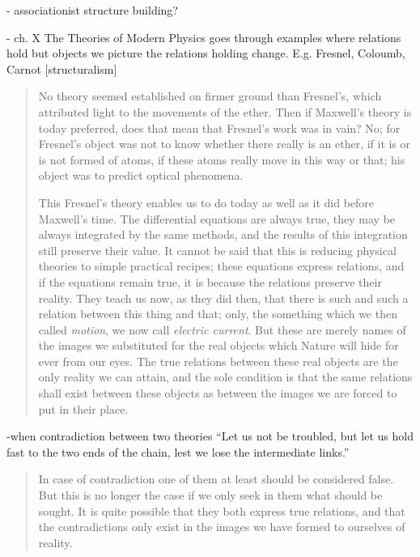  - associationist structure building?
 
 - ch. X The Theories of Modern Physics goes through examples where relations hold but objects we picture the relations holding change.  E.g. Fresnel, Coloumb, Carnot [structuralism]
 
 \begin{quote}
     No theory seemed established on firmer ground than Fresnel's, which attributed light to the movements of the ether.  Then if Maxwell's theory is today preferred, does that mean that Fresnel's work was in vain?  No; for Fresnel's object was not to know whether there really is an ether, if it is or is not formed of atoms, if these atoms really move in this way or that; his object was to predict optical phenomena.
     
     This Fresnel's theory enables us to do today as well as it did before Maxwell's time.  The differential equations are always true, they may be always integrated by the same methods, and the results of this integration still preserve their value.  It cannot be said that this is reducing physical theories to simple practical recipes; these equations express relations, and if the equations remain true, it is because the relations preserve their reality.  They teach us now, as they did then, that there is such and such a relation between this thing and that; only, the something which we then called \emph{motion}, we now call \emph{electric current}.  But these are merely names of the images we substituted for the real objects which Nature will hide for ever from our eyes.  The true relations between these real objects are the only reality we can attain, and the sole condition is that the same relations shall exist between these objects as between the images we are forced to put in their place.  \citep[p. 160-161]{Poincare1952}
 \end{quote}
 
 -when contradiction between two theories ``Let us not be troubled, but let us hold fast to the two ends of the chain, lest we lose the intermediate links.''
 
 \begin{quote}
     In case of contradiction one of them at least should be considered false.  But this is no longer the case if we only seek in them what should be sought.  It is quite possible that they both express true relations, and that the contradictions only exist in the images we have formed to ourselves of reality.  \citep[p. 163]{Poincare1952}
 \end{quote}
 
